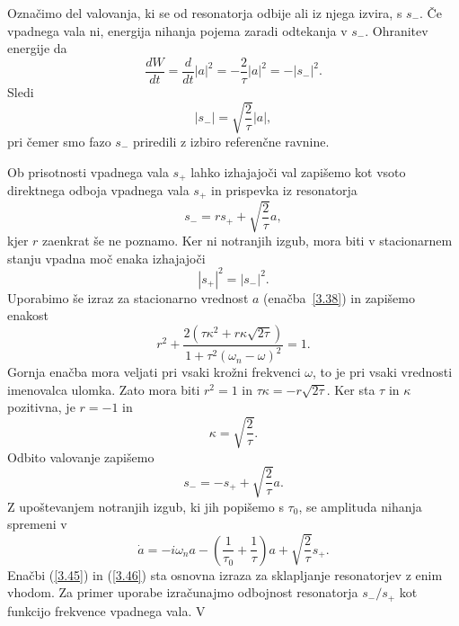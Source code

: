 Označimo del valovanja, ki se od resonatorja odbije ali iz njega izvira, s $s_{-}$.
Če vpadnega vala ni, energija nihanja pojema zaradi odtekanja v $s_{-}$.
Ohranitev energije da 
\begin{equation}
\frac{dW}{dt}=\frac{d}{dt}|a|^{2}=-\frac{2}{\tau}|a|^{2}=-|s_{-}|^{2}.
\label{3.39}
\end{equation}
Sledi
\begin{equation}
|s_{-}|=\sqrt{\frac{2}{\tau}}|a|,
\label{3.40}
\end{equation}
pri čemer smo fazo $s_{-}$ priredili z izbiro referenčne ravnine.

Ob prisotnosti vpadnega vala $s_{+}$ lahko izhajajoči val zapišemo kot
vsoto direktnega odboja vpadnega vala $s_{+}$ in prispevka iz resonatorja
\begin{equation}
s_{-}=rs_{+}+\sqrt{\frac{2}{\tau}}a,
\label{3.41}
\end{equation}
kjer $r$ zaenkrat še ne poznamo. Ker ni notranjih izgub, mora biti v 
stacionarnem stanju vpadna moč enaka izhajajoči
\begin{equation}
|s_{+}|^{2}=|s_{-}|^{2}.
\label{3.42}
\end{equation}
Uporabimo še izraz za stacionarno vrednost $a$  (enačba~\ref{3.38}) in zapišemo
enakost 
\begin{equation}
r^{2}+\frac{2(\tau\kappa^{2}+r\kappa\sqrt{2\tau})}{1+\tau^{2}(\omega_{n}-\omega)^{2}}=1.
\label{3.43}
\end{equation}
Gornja enačba mora veljati pri vsaki krožni  frekvenci $\omega$, to je pri vsaki vrednosti imenovalca
ulomka. Zato mora biti $r^{2}=1$ in $\tau\kappa=-r\sqrt{2\tau}$.
Ker sta $\tau$ in $\kappa$ pozitivna, je $r=-1$ in 
\begin{equation}
\kappa=\sqrt{\frac{2}{\tau}}.
\label{3.44}
\end{equation}
 Odbito valovanje zapišemo 
\begin{equation}
s_{-}=-s_{+}+\sqrt{\frac{2}{\tau}}a.
\label{3.45}
\end{equation}
Z upoštevanjem notranjih izgub, ki jih popišemo s $\tau_0$, se amplituda nihanja spremeni v 
\begin{equation}
\dot{a}=-i\omega_{n}a-\left(\frac{1}{\tau_{0}}+\frac{1}{\tau}\right)a+
\sqrt{\frac{2}{\tau}}s_{+}.
\label{3.46}
\end{equation}
 Enačbi (\ref{3.45}) in (\ref{3.46}) sta osnovna izraza za sklapljanje
resonatorjev z enim vhodom. Za primer uporabe izračunajmo odbojnost
resonatorja $s_{-}/s_{+}$ kot funkcijo frekvence vpadnega vala. V
